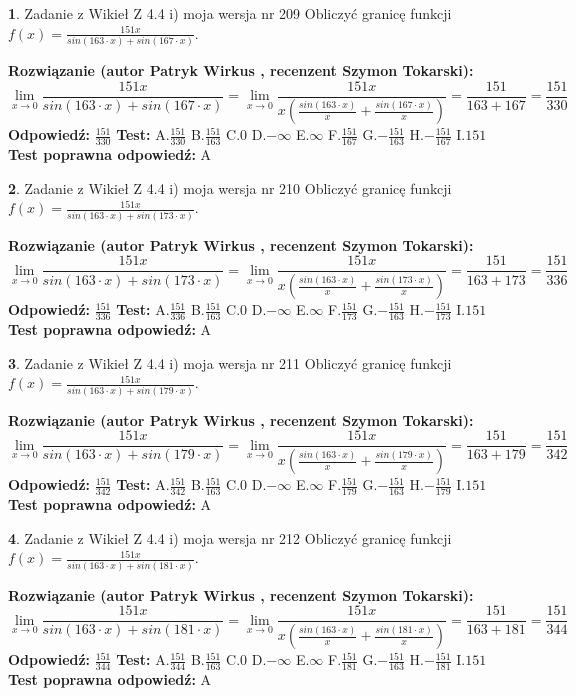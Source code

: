 \documentclass[12pt, a4paper]{article}
\theoremstyle{definition} %
\newtheorem{zad}{}
\newcommand{\zadStart}[1]{\begin{zad}#1\newline}
\newcommand{\zadStop}{\end{zad}}
\newcommand{\rozwStart}[2]{\noindent \textbf{Rozwiązanie (autor #1 , recenzent #2): }\newline}
\newcommand{\rozwStop}{\newline}
\newcommand{\odpStart}{\noindent \textbf{Odpowiedź:}\newline}
\newcommand{\odpStop}{\newline}
\newcommand{\testStart}{\noindent \textbf{Test:}\newline}
\newcommand{\testStop}{\newline}
\newcommand{\kluczStart}{\noindent \textbf{Test poprawna odpowiedź:}\newline}
\newcommand{\kluczStop}{\newline}
\begin{document}
\zadStart{Zadanie z Wikieł Z 4.4 i) moja wersja nr 209}
Obliczyć granicę funkcji $f(x)=\frac{151x}{sin(163\cdot x) +sin(167\cdot x)}$.
\zadStop
\rozwStart{Patryk Wirkus}{Szymon Tokarski}
$$\lim\limits_{x\to 0}\frac{151x}{sin(163\cdot x) +sin(167\cdot x)}=\lim\limits_{x\to 0}\frac{151x}{x(\frac{sin(163\cdot x)}{x}+\frac{sin(167\cdot x)}{x})}=\frac{151}{163+167} = \frac{151}{330}$$
\rozwStop
\odpStart
$\frac{151}{330}$
\odpStop
\testStart
A.$\frac{151}{330}$
B.$\frac{151}{163}$
C.$0$
D.$-\infty$
E.$\infty$
F.$\frac{151}{167}$
G.$-\frac{151}{163}$
H.$-\frac{151}{167}$
I.$151$
\testStop
\kluczStart
A
\kluczStop



\zadStart{Zadanie z Wikieł Z 4.4 i) moja wersja nr 210}
Obliczyć granicę funkcji $f(x)=\frac{151x}{sin(163\cdot x) +sin(173\cdot x)}$.
\zadStop
\rozwStart{Patryk Wirkus}{Szymon Tokarski}
$$\lim\limits_{x\to 0}\frac{151x}{sin(163\cdot x) +sin(173\cdot x)}=\lim\limits_{x\to 0}\frac{151x}{x(\frac{sin(163\cdot x)}{x}+\frac{sin(173\cdot x)}{x})}=\frac{151}{163+173} = \frac{151}{336}$$
\rozwStop
\odpStart
$\frac{151}{336}$
\odpStop
\testStart
A.$\frac{151}{336}$
B.$\frac{151}{163}$
C.$0$
D.$-\infty$
E.$\infty$
F.$\frac{151}{173}$
G.$-\frac{151}{163}$
H.$-\frac{151}{173}$
I.$151$
\testStop
\kluczStart
A
\kluczStop



\zadStart{Zadanie z Wikieł Z 4.4 i) moja wersja nr 211}
Obliczyć granicę funkcji $f(x)=\frac{151x}{sin(163\cdot x) +sin(179\cdot x)}$.
\zadStop
\rozwStart{Patryk Wirkus}{Szymon Tokarski}
$$\lim\limits_{x\to 0}\frac{151x}{sin(163\cdot x) +sin(179\cdot x)}=\lim\limits_{x\to 0}\frac{151x}{x(\frac{sin(163\cdot x)}{x}+\frac{sin(179\cdot x)}{x})}=\frac{151}{163+179} = \frac{151}{342}$$
\rozwStop
\odpStart
$\frac{151}{342}$
\odpStop
\testStart
A.$\frac{151}{342}$
B.$\frac{151}{163}$
C.$0$
D.$-\infty$
E.$\infty$
F.$\frac{151}{179}$
G.$-\frac{151}{163}$
H.$-\frac{151}{179}$
I.$151$
\testStop
\kluczStart
A
\kluczStop



\zadStart{Zadanie z Wikieł Z 4.4 i) moja wersja nr 212}
Obliczyć granicę funkcji $f(x)=\frac{151x}{sin(163\cdot x) +sin(181\cdot x)}$.
\zadStop
\rozwStart{Patryk Wirkus}{Szymon Tokarski}
$$\lim\limits_{x\to 0}\frac{151x}{sin(163\cdot x) +sin(181\cdot x)}=\lim\limits_{x\to 0}\frac{151x}{x(\frac{sin(163\cdot x)}{x}+\frac{sin(181\cdot x)}{x})}=\frac{151}{163+181} = \frac{151}{344}$$
\rozwStop
\odpStart
$\frac{151}{344}$
\odpStop
\testStart
A.$\frac{151}{344}$
B.$\frac{151}{163}$
C.$0$
D.$-\infty$
E.$\infty$
F.$\frac{151}{181}$
G.$-\frac{151}{163}$
H.$-\frac{151}{181}$
I.$151$
\testStop
\kluczStart
A
\kluczStop
\end{document}
